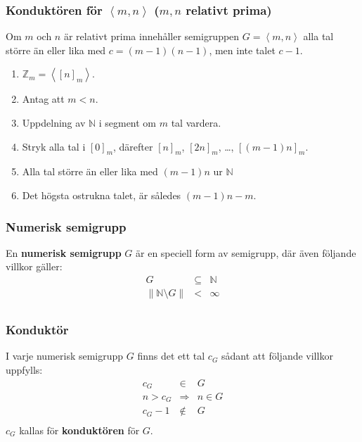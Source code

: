 \documentclass{beamer}
\begin{document}
\begin{frame}
	\frametitle{Konduktören för $\left<m,n\right>$ ($m, n$ relativt prima)}
\begin{Theorem}
	Om $m$ och $n$ är relativt prima innehåller semigruppen $G = \left<m, n\right>$ alla tal större än eller lika med $c = (m - 1)(n - 1)$, men inte talet $c - 1$.
\end{Theorem}

\begin{enumerate}
	\item<3-> $\mathbb{Z}_m = \left<[n]_m\right>$.
	\item<4-> Antag att $m<n$.
	\item<5-> Uppdelning av $\mathbb{N}$ i segment om $m$ tal vardera.
	\item<6-> Stryk alla tal i $[0]_m$, därefter $[n]_m$, $[2n]_m$, \ldots, $\left[(m-1)n\right]_m$.
	\item<7-> Alla tal större än eller lika med $(m-1)n$ ur $\mathbb{N}$
	\item<8-> Det högsta ostrukna talet, är således $(m - 1)n - m$.
\end{enumerate}
\end{frame}

\begin{frame}
	\frametitle{Numerisk semigrupp}
\begin{Definition}
	En \textbf{numerisk semigrupp} $G$ är en speciell form av semigrupp, där även följande villkor gäller:
	\[
	\begin{array}{rcl}
	G & \subseteq & \mathbb{N} \\
	\left\| \mathbb{N} \setminus G \right\| & < & \infty \\
	\end{array}\]
\end{Definition}

\end{frame}

\begin{frame}
	\frametitle{Konduktör}
\begin{Definition}
	I varje numerisk semigrupp $G$ finns det ett tal $c_G$ sådant att följande villkor uppfylls:
	\[\begin{array}{rcl}
	c_G & \in & G \\
	n > c_G & \Longrightarrow & n \in G \\
	c_G - 1 & \notin & G \\
	\end{array}\]
	$c_G$ kallas för \textbf{konduktören} för $G$.
\end{Definition}
\end{frame}
\end{document}
